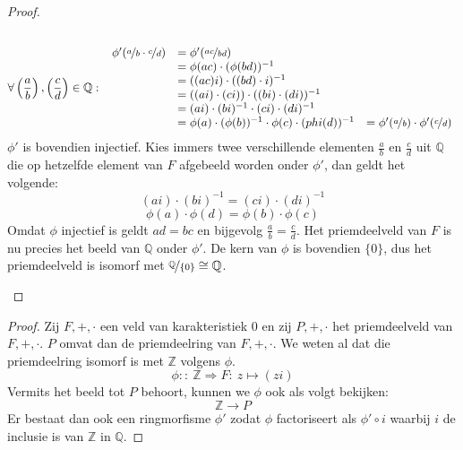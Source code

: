 \documentclass[main.tex]{subfiles}
\begin{document}
\begin{st}
\begin{proof}
\begin{itemize}
\[\begin{array}{rll}
      \end{array}
      \]
      \[
      \forall \left(\frac{a}{b}\right),\left(\frac{c}{d}\right) \in
      \mathbb{Q}:\
      \begin{array}{rll}
        \phi'(\nicefrac{a}{b} \cdot \nicefrac{c}{d}) &= \phi'(\nicefrac{ac}{bd}) &\\
                                                     &= \phi(ac) \cdot (\phi(bd))^{-1} &\\
                                                     &= ((ac)i) \cdot ((bd) \cdot i)^{-1} &\\
                                                     &= ((ai) \cdot (ci)) \cdot ((bi) \cdot (di))^{-1} &\\
                                                     &= (ai) \cdot (bi)^{-1} \cdot (ci) \cdot (di)^{-1} &\\
                                                     &= \phi(a) \cdot (\phi(b))^{-1} \cdot \phi(c) \cdot (phi(d))^{-1} &= \phi'(\nicefrac{a}{b}) \cdot \phi'(\nicefrac{c}{d})
      \end{array}
      \]
      $\phi'$ is bovendien injectief.  Kies immers twee verschillende
      elementen $\frac{a}{b}$ en $\frac{c}{d}$ uit $\mathbb{Q}$ die op
      hetzelfde element van $F$ afgebeeld worden onder $\phi'$, dan
      geldt het volgende:
      \[ (ai) \cdot (bi)^{-1} = (ci) \cdot (di)^{-1} \]
      \[ \phi(a) \cdot \phi(d) = \phi(b) \cdot \phi(c) \]
      Omdat $\phi$ injectief is geldt $ad = bc$ en bijgevolg
      $\frac{a}{b} = \frac{c}{d}$.
      Het priemdeelveld van $F$ is nu precies het beeld van $\mathbb{Q}$ onder $\phi'$. \waarom
      De kern van $\phi$ is bovendien $\{0\}$, dus het priemdeelveld is isomorf met $\nicefrac{\mathbb{Q}}{\{0\}} \cong \mathbb{Q}$.
    \end{itemize}
  \end{proof}
  \begin{proof}
    Zij $F,+,\cdot$ een veld van karakteristiek $0$ en zij $P,+,\cdot$ het priemdeelveld van $F,+,\cdot$.
    $P$ omvat dan de priemdeelring van $F,+,\cdot$.
    We weten al dat die priemdeelring isomorf is met $\mathbb{Z}$ volgens $\phi$.
    \[ \phi::\ \mathbb{Z} \Rightarrow F:\ z \mapsto (zi)\]
    Vermits het beeld tot $P$ behoort, kunnen we $\phi$ ook als volgt bekijken:
    \[ \mathbb{Z} \rightarrow P \]
    Er bestaat dan ook een ringmorfisme $\phi'$ zodat $\phi$ factoriseert als $\phi' \circ i$ waarbij $i$ de inclusie is van $\mathbb{Z}$ in $\mathbb{Q}$. 

\end{proof}
\end{st}
\end{document}
